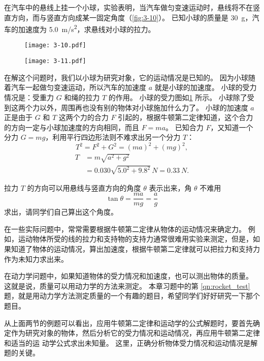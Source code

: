 \begin{example}
在汽车中的悬线上挂一个小球，实验表明，当汽车做匀变速运动时，悬线将不在竖直方向，而与竖直方向成某一固定角度（\cref{fig:3-10}）。
已知小球的质量是 \qty{30}{g}，汽车的加速度为 \qty{5.0}{m/s^2}，求悬线对小球的拉力。
\end{example}

\begin{figure}
  \begin{minipage}[b]{0.55\linewidth}\centering
    \texttt{[image: 3-10.pdf]}
    \caption{}\label{fig:3-10}
  \end{minipage}
  \begin{minipage}[b]{0.4\linewidth}\centering
    \texttt{[image: 3-11.pdf]}
    \caption{}\label{fig:3-11}
  \end{minipage}
\end{figure}

\begin{solution}
在解这个问题时，我们以小球为研究对象，它的运动情况是已知的。
因为小球随着汽车一起做匀变速运动，所以汽车的加速度 $a$ 就是小球的加速度。
小球的受力情况是：受重力 $G$ 和绳的拉力 $T$ 的作用。
小球的受力图如\cref{fig:3-11} 所示。
小球除了受到这两个力以外，周围再也没有别的物体对小球施加什么力了。
小球的加速度 $a$ 正是由于 $G$ 和 $T$ 这两个力的合力 $F$ 引起的，根据牛顿第二定律知道，这个合力的方向一定与小球加速度的方向相同，而且 $F=ma$。
已知合力 $F$，又知道一个分力 $G=mg$，利用平行四边形法则不难求出另一个分力 $T$：
\[T^2=F^2+G^2=(ma)^2+(mg)^2,\]
\[\begin{split}
T&=m\sqrt{a^2+g^2}\\
&=0.030\sqrt{5.0^2+9.8^2}\,\unit{N}=\qty{0.33}{N}.
\end{split} \]
\end{solution}

拉力 $T$ 的方向可以用悬线与竖直方向的角度 $\theta$ 表示出来，角 $\theta$ 不难用
\[\tan\theta =\frac{ma}{mg}=\frac{a}{g}\]
求出，请同学们自己算出这个角度。

在一些实际问题中，常常需要根据牛顿第二定律从物体的运动情况来确定力。
例如，运动物体所受的线的拉力和支持物的支持力通常很难用实验来测定，但是，如果知道了物体的运动情况，算出加速度，根据牛顿第二定律就可以把拉力和支持力作为未知力求出来。

在动力学问题中，如果知道物体的受力情况和加速度，也可以测出物体的质量。
这就是说，质量可以用动力学的方法来测定。
本章习题中的第 \ref{qn:rocket_test} 题，就是用动力学方法测定质量的一个有趣的题目，希望同学们好好研究一下那个题目。

从上面两节的例题可以看出，应用牛顿第二定律和运动学的公式解题时，要首先确定作为研究对象的物体，然后分析它的受力情况和运动情况，再应用牛顿第二定律和适当的运
动学公式求出未知量。
这里，正确分析物体受力情况和运动情况是解题的关键。

